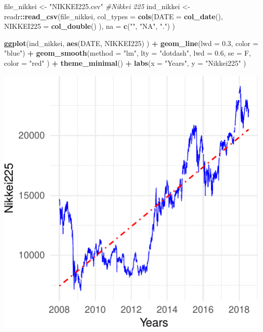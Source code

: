 \documentclass[11pt,]{article}
\newenvironment{Shaded}{\begin{snugshade}}{\end{snugshade}}
\newcommand{\KeywordTok}[1]{\textcolor[rgb]{0.13,0.29,0.53}{\textbf{#1}}}
\newcommand{\DataTypeTok}[1]{\textcolor[rgb]{0.13,0.29,0.53}{#1}}
\newcommand{\FloatTok}[1]{\textcolor[rgb]{0.00,0.00,0.81}{#1}}
\newcommand{\StringTok}[1]{\textcolor[rgb]{0.31,0.60,0.02}{#1}}
\newcommand{\CommentTok}[1]{\textcolor[rgb]{0.56,0.35,0.01}{\textit{#1}}}
\newcommand{\OperatorTok}[1]{\textcolor[rgb]{0.81,0.36,0.00}{\textbf{#1}}}
\newcommand{\NormalTok}[1]{#1}
\begin{document}
\begin{Shaded}
\begin{Highlighting}[]
\NormalTok{file_nikkei <-}\StringTok{ "NIKKEI225.csv"} \CommentTok{#Nikkei 225}
\NormalTok{ind_nikkei <-}\StringTok{ }\NormalTok{readr}\OperatorTok{::}\KeywordTok{read_csv}\NormalTok{(file_nikkei, }
                             \DataTypeTok{col_types =} \KeywordTok{cols}\NormalTok{(}\DataTypeTok{DATE =} \KeywordTok{col_date}\NormalTok{(), }
                                              \DataTypeTok{NIKKEI225 =} \KeywordTok{col_double}\NormalTok{()}
\NormalTok{                                              ),}
                             \DataTypeTok{na =} \KeywordTok{c}\NormalTok{(}\StringTok{""}\NormalTok{, }\StringTok{"NA"}\NormalTok{, }\StringTok{"."}\NormalTok{)}
\NormalTok{                             )}

\KeywordTok{ggplot}\NormalTok{(ind_nikkei, }
       \KeywordTok{aes}\NormalTok{(DATE, NIKKEI225)}
\NormalTok{       ) }\OperatorTok{+}
\StringTok{  }\KeywordTok{geom_line}\NormalTok{(}\DataTypeTok{lwd =} \FloatTok{0.3}\NormalTok{, }
            \DataTypeTok{color =} \StringTok{"blue"}\NormalTok{) }\OperatorTok{+}
\StringTok{  }\KeywordTok{geom_smooth}\NormalTok{(}\DataTypeTok{method =} \StringTok{"lm"}\NormalTok{,}
              \DataTypeTok{lty =} \StringTok{"dotdash"}\NormalTok{,}
              \DataTypeTok{lwd =} \FloatTok{0.6}\NormalTok{,}
              \DataTypeTok{se =}\NormalTok{ F,}
              \DataTypeTok{color =} \StringTok{"red"}
\NormalTok{              ) }\OperatorTok{+}
\StringTok{  }\KeywordTok{theme_minimal}\NormalTok{() }\OperatorTok{+}
\StringTok{  }\KeywordTok{labs}\NormalTok{(}\DataTypeTok{x =} \StringTok{"Years"}\NormalTok{,}
       \DataTypeTok{y =} \StringTok{"Nikkei225"}
\NormalTok{       )}
\end{Highlighting}
\end{Shaded}

\begin{center}\includegraphics{FMC_T4_PhD_Fin_Time_Series_files/figure-latex/Nikkei-1} \end{center}
\end{document}
